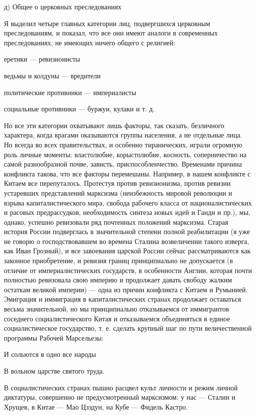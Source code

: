 д) Общее о церковных преследованиях

Я  выделил  четыре  главных   категории  лиц,  подвергшихся  церковным
преследованиям, и  показал, что  все они  имеют аналоги  в современных
преследованиях, не имеющих ничего общего с религией:

еретики --- ревизионисты

ведьмы и колдуны --- вредители

политические противники --- империалисты

социальные противники --- буржуи, кулаки и т. д.

Но   все  эти   категории  охватывают   лишь  факторы,   так  сказать,
безличного характера,  когда врагами  оказываются группы  населения, а
не  отдельные  лица. Но  всегда  во  всех правительствах,  и  особенно
тиранических,  играли  огромную   роль  личные  моменты:  властолюбие,
корыстолюбие,  косность, соперничество  на самой  разнообразной почве,
зависть, приспособленчество.  Временами причина конфликта  такова, что
все  факторы перемешаны.  Например,  в нашем  конфликте  с Китаем  все
перепуталось. Протестуя против ревизионизма, против ревизии устаревших
представлений  марксизма  (неизбежность  мировой  революции  и  взрыва
капиталистического мира, свобода рабочего класса от националистических
и  расовых предрассудков,  необходимость  синтеза новых  идей и  Ганди
и  пр.),  мы,  однако,  успешно  ревизовали  ряд  почтенных  положений
марксизма. Старая  история России  подверглась в  значительной степени
полной реабилитации  (я уже  не говорю  о господствовавшем  во времена
Сталина  возвеличении  такого  изверга,   как  Иван  Грозный),  и  все
завоевания   царской  России   сейчас  рассматриваются   как  законное
приобретение, и ревизия границ принципиально не допускается (в отличие
от  империалистических  государств,   в  особенности  Англии,  которая
почти полностью  ревизовала свою  империю и продолжает  давать свободу
жалким  остаткам  великой  империи)   ---  одна  из  причин  конфликта
с  Китаем  и  Румынией.  Эмиграция и  иммиграция  в  капиталистических
странах продолжает оставаться весьма значительной, но мы принципиально
отказываемся  от  иммигрантов   соседнего  социалистического  Китая  и
отказываемся  объединяться в  единое социалистическое  государство, т.
е.  сделать  крупный  шаг  по пути  величественной  программы  Рабочей
Марсельезы:

И сольются в одно все народы

В вольном царстве святого труда.

В социалистических странах пышно расцвел культ личности и режим личной
диктатуры, совершенно не предусмотренный  марксизмом: у нас --- Сталин
и Хрущев, в Китае --- Мао Цзэдун, на Кубе --- Фидель Кастро.

